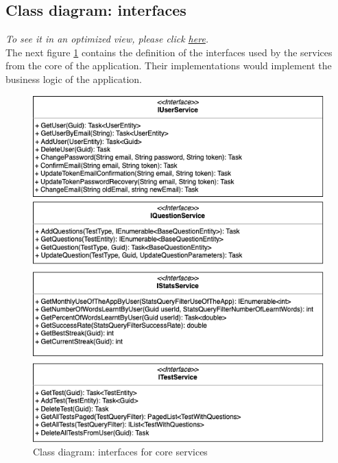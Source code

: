         \subsection{Class diagram: interfaces}
            \textit{To see it in an optimized view, please click \href{https://github.com/JesusGonzalezA/LearnASLDoc/blob/master/doc/assets/diagrams/interfaces.png}{here}.} \\
            The next figure \ref{fig:implementation_interfaces} contains the definition of the interfaces used by the services from the core of the application. Their implementations 
            would implement the business logic of the application.
            \begin{figure}[H]
                \centering
                    \includegraphics[width=\textwidth]{assets/diagrams/interfaces.png}
                \caption{Class diagram: interfaces for core services}
                \label{fig:implementation_interfaces}
            \end{figure}

